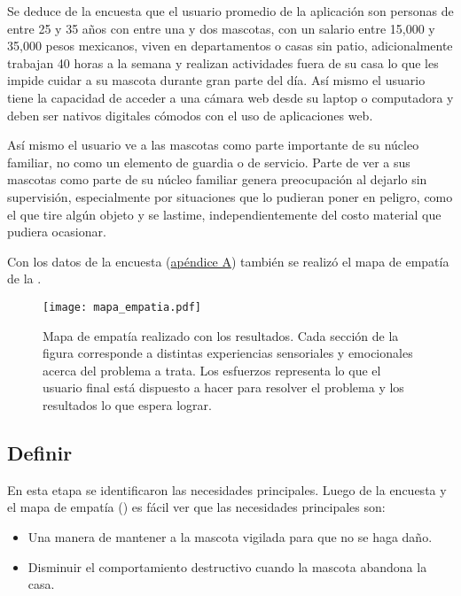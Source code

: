 \documentclass[12pt,a4paper]{proyectoinnovacion}
\begin{document}
Se deduce de la encuesta que el usuario promedio de la aplicación son personas de entre 25 y 35 años con entre una y dos mascotas, con un salario entre 15,000 y 35,000 pesos mexicanos, viven en departamentos o casas sin patio, adicionalmente trabajan 40 horas a la semana y realizan actividades fuera de su casa lo que les impide cuidar a su mascota durante gran parte del día. Así mismo el usuario tiene la capacidad de acceder a una cámara web desde su laptop o computadora y deben ser nativos digitales cómodos con el uso de aplicaciones web.

Así mismo el usuario ve a las mascotas como parte importante de su núcleo familiar, no como un elemento de guardia o de servicio. Parte de ver a sus mascotas como parte de su núcleo familiar genera preocupación al dejarlo sin supervisión, especialmente por situaciones que lo pudieran poner en peligro, como el que tire algún objeto y se lastime, independientemente del costo material que pudiera ocasionar.

Con los datos de la encuesta (\hyperref[ape:tablaencuesta]{apéndice A}) también se realizó el mapa de empatía de la . 


\begin{landscape}
  \begin{figure}
      \centering
      \caption[Mapa de empatía del proyecto.]{Mapa de empatía realizado con los resultados. Cada sección de la figura corresponde a distintas experiencias sensoriales y emocionales acerca del problema a trata. Los esfuerzos representa lo que el usuario final está dispuesto a hacer para resolver el problema y los resultados lo que espera lograr.}
      \label{fig:mapaempatia}
      \texttt{[image: mapa\_empatia.pdf]}
  \end{figure}
\end{landscape}

\subsection{Definir}
\label{sec:definir}

En esta etapa se identificaron las necesidades principales. Luego de la encuesta y el mapa de empatía () es fácil ver que las necesidades principales son:


\begin{itemize}
  \item Una manera de mantener a la mascota vigilada para que no se haga daño.\item Disminuir el comportamiento destructivo cuando la mascota abandona la casa.
\end{itemize}
\end{document}

